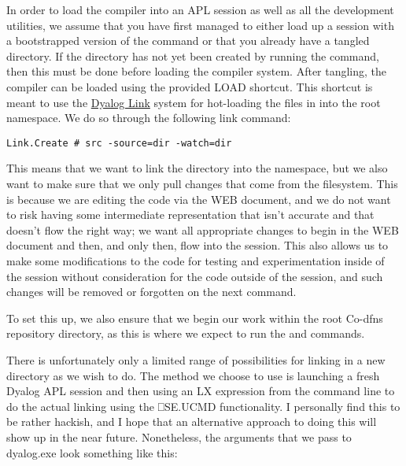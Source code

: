 \documentclass{article}%
\begin{document}
In order to load the compiler into an APL session as well as all the
development utilities,
we assume that you have first managed to either load up a session
with a bootstrapped version of the {\Tt{}\nwendquote} command or that you
already have a tangled {\Tt{}\nwendquote} directory.
If the {\Tt{}\nwendquote} directory has not yet been created by running the
{\Tt{}\nwendquote} command,
then this must be done before loading the compiler system.
After tangling,
the compiler can be loaded using the provided {\Tt{}LOAD\nwendquote} shortcut.
This shortcut is meant to use the
\href{https://github.com/Dyalog/link}{Dyalog Link}
system for hot-loading the files in {\Tt{}\nwendquote} into the root namespace.
We do so through the following link command:

\begin{verbatim}
Link.Create # src -source=dir -watch=dir
\end{verbatim}

\noindent
This means that we want to link the {\Tt{}\nwendquote} directory into the {\Tt{}{\#}\nwendquote}
namespace,
but we also want to make sure that we only pull changes that come
from the filesystem.
This is because we are editing the code via the WEB document,
and we do not want to risk having some intermediate representation
that isn't accurate and that doesn't flow the right way;
we want all appropriate changes to begin in the WEB document
and then, and only then, flow into the session.
This also allows us to make some modifications to the code for testing
and experimentation inside of the session without consideration
for the code outside of the session,
and such changes will be removed or forgotten on the next {\Tt{}\nwendquote}
command.

To set this up, we also ensure that we begin our work within the
root Co-dfns repository directory, as this is where we expect to run
the {\Tt{}\nwendquote} and {\Tt{}\nwendquote} commands.

There is unfortunately only a limited range of possibilities for
linking in a new directory as we wish to do.
The method we choose to use is launching a fresh Dyalog APL session
and then using an {\Tt{}LX\nwendquote} expression from the command line
to do the actual linking using the {\Tt{}⎕SE.UCMD\nwendquote} functionality.
I personally find this to be rather hackish, and I hope that an
alternative approach to doing this will show up in the near future.
Nonetheless, the arguments that we pass to {\Tt{}dyalog.exe\nwendquote}
look something like this:
\end{document}
